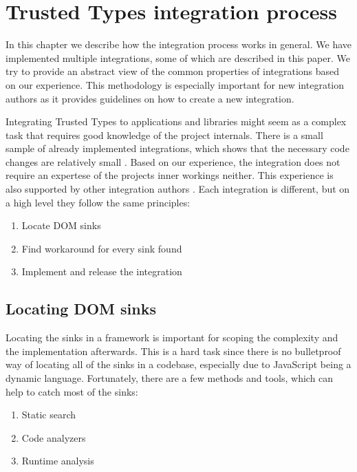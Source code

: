 \chapter{Trusted Types integration process}
\label{tt_integration_setup}

In this chapter we describe how the integration process works in general. We have implemented
multiple integrations, some of which are described in this paper. We try to provide an abstract view
of the common properties of integrations based on our experience. This methodology is especially
important for new integration authors as it provides guidelines on how to create a new integration.

Integrating Trusted Types to applications and libraries might seem as a complex task that requires
good knowledge of the project internals. There is a small sample of already implemented
integrations, which shows that the necessary code changes are relatively small
\cite{tt_integration_list}. Based on our experience, the integration does not require an expertese
of the projects inner workings neither. This experience is also supported by other integration
authors \cite{tt_web_framework_paper}. Each integration is different, but on a high level they
follow the same principles:

\begin{enumerate}
  \item Locate DOM sinks
  \item Find workaround for every sink found
  \item Implement and release the integration
\end{enumerate}

\section{Locating DOM sinks}

Locating the sinks in a framework is important for scoping the complexity and the implementation
afterwards. This is a hard task since there is no bulletproof way of locating all of the sinks in a
codebase, especially due to JavaScript being a dynamic language. Fortunately, there are a few
methods and tools, which can help to catch most of the sinks:

\begin{enumerate}
  \item Static search
  \item Code analyzers
  \item Runtime analysis
\end{enumerate}

